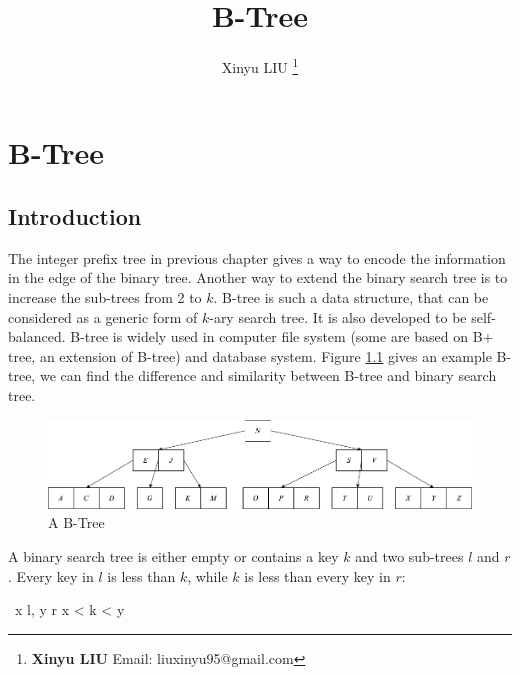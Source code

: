 \documentclass[b5paper]{article}
\begin{document}
\title{B-Tree}

\author{Xinyu LIU
\thanks{{\bfseries Xinyu LIU} \newline
  Email: liuxinyu95@gmail.com \newline}
  }

\maketitle
\fi


\ifx\wholebook\relax
\chapter{B-Tree}
\fi

\section{Introduction}
\label{introduction}

The integer prefix tree in previous chapter gives a way to encode the information in the edge of the binary tree. Another way to extend the binary search tree is to increase the sub-trees from 2 to $k$. B-tree is such a data structure, that can be considered as a generic form of $k$-ary search tree. It is also developed to be self-balanced\cite{wiki-b-tree}. B-tree is widely used in computer file system (some are based on B+ tree, an extension of B-tree) and database system. Figure \ref{fig:btree-example} gives an example B-tree, we can find the difference and similarity between B-tree and binary search tree.

\begin{figure}[htbp]
  \centering
  \includegraphics[scale=0.33]{img/btree-del-before.png}
  \caption{A B-Tree}
  \label{fig:btree-example}
\end{figure}

A binary search tree is either empty or contains a key $k$ and two sub-trees $l$ and $r$. Every key in $l$ is less than $k$, while $k$ is less than every key in $r$:

\be
\forall\ x \in l, y \in r \Rightarrow x < k < y
\ee
\end{document}
